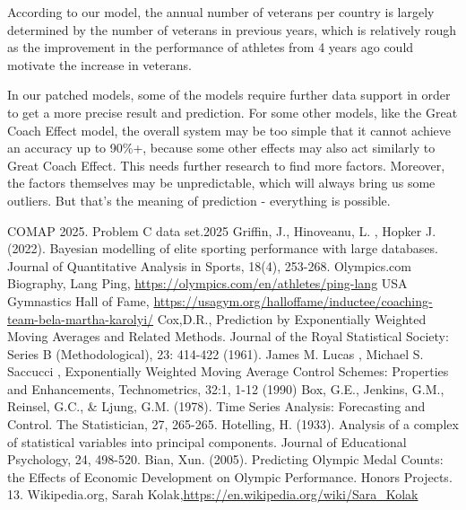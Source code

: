 \documentclass{mcmthesis}
\begin{document}
According to our model, the annual number of veterans per country is largely determined by the number of veterans in previous years, which is relatively rough as the improvement in the performance of athletes from 4 years ago could motivate the increase in veterans.

In our patched models, some of the models require further data support in order to get a more precise result and prediction. For some other models, like the Great Coach Effect model, the overall system may be too simple that it cannot achieve an accuracy up to 90\%+, because some other effects may also act similarly to Great Coach Effect. This needs further research to find more factors. Moreover, the factors themselves may be unpredictable, which will always bring us some outliers. But that's the meaning of prediction - everything is possible.



\newpage

\begin{thebibliography}{99}

 COMAP 2025. Problem C data set.2025
 Griffin, J., Hinoveanu, L. , Hopker J. (2022). Bayesian modelling of elite sporting performance with large databases. Journal of Quantitative Analysis in Sports, 18(4), 253-268.
 Olympics.com Biography, Lang Ping, \url{https://olympics.com/en/athletes/ping-lang}
 USA Gymnastics Hall of Fame,
\url{https://usagym.org/halloffame/inductee/coaching-team-bela-martha-karolyi/}
 Cox,D.R., Prediction by Exponentially Weighted Moving Averages and Related Methods. Journal of the Royal Statistical Society: Series B (Methodological), 23: 414-422 (1961).
 James M. Lucas , Michael S. Saccucci , Exponentially Weighted Moving Average Control Schemes: Properties and Enhancements, Technometrics, 32:1, 1-12 (1990)
 Box, G.E., Jenkins, G.M., Reinsel, G.C., \& Ljung, G.M. (1978). Time Series Analysis: Forecasting and Control. The Statistician, 27, 265-265.
 Hotelling, H. (1933). Analysis of a complex of statistical variables into principal components. Journal of Educational Psychology, 24, 498-520.
 Bian, Xun. (2005). Predicting Olympic Medal Counts: the Effects of Economic Development on Olympic Performance. Honors Projects. 13. 
 Wikipedia.org, Sarah Kolak,\url{https://en.wikipedia.org/wiki/Sara_Kolak}

\end{thebibliography}
\end{document}

